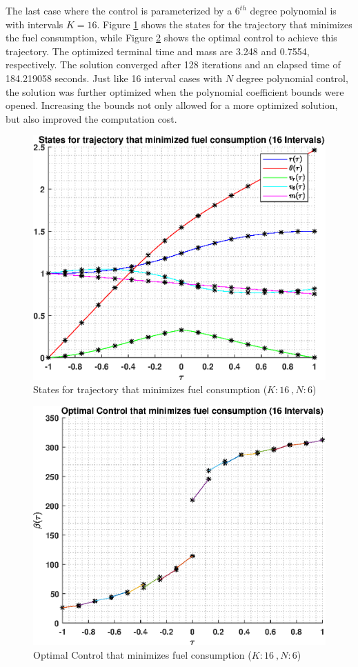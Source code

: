 \documentclass[]{article}
\begin{document}
The last case where the control is parameterized by a \(6^{th}\) degree polynomial is with intervals \(K = 16\). Figure \ref{fig:directStatesK16Poly6} shows the states for the trajectory that minimizes the fuel consumption, while Figure \ref{fig:directControlK16Poly6} shows the optimal control to achieve this trajectory. The optimized terminal time and mass are 3.248 and 0.7554, respectively. The solution converged after 128 iterations and an elapsed time of  184.219058 seconds. Just like 16 interval cases with \(N\) degree polynomial control, the solution was further optimized when the polynomial coefficient bounds were opened. Increasing the bounds not only allowed for a more optimized solution, but also improved the computation cost. 
\begin{figure}
	\centering
	\includegraphics[scale=0.75]{directStatesK16Poly6.eps}
	\caption{States for trajectory that minimizes fuel consumption (\(K:16\ , N:6\))}
	\label{fig:directStatesK16Poly6}
\end{figure}
\begin{figure}
	\centering
	\includegraphics[scale=0.75]{directControlK16Poly6.eps}
	\caption{Optimal Control that minimizes fuel consumption (\(K:16\ , N:6\))}
	\label{fig:directControlK16Poly6}
\end{figure}
\end{document}
